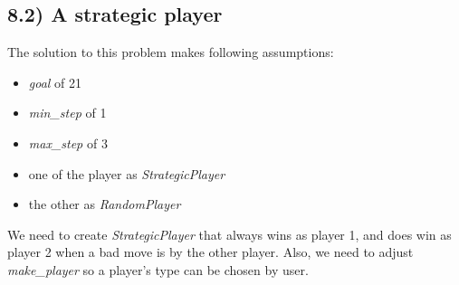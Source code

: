 \documentclass[12pt]{article}
\begin{document}
\subsection*{8.2) A strategic player}

The solution to this problem makes following assumptions:

\begin{itemize}
    \item \textit{goal} of 21
    \item \textit{min\_step} of 1
    \item \textit{max\_step} of 3
    \item one of the player as \textit{StrategicPlayer}
    \item the other as \textit{RandomPlayer}
\end{itemize}

\bigskip

\noindent We need to create \textit{StrategicPlayer} that always wins as
player 1, and does win as player 2 when a bad move is by the other player.
Also, we need to adjust \textit{make\_player} so a player's type can be
chosen by user.

\bigskip
\end{document}
